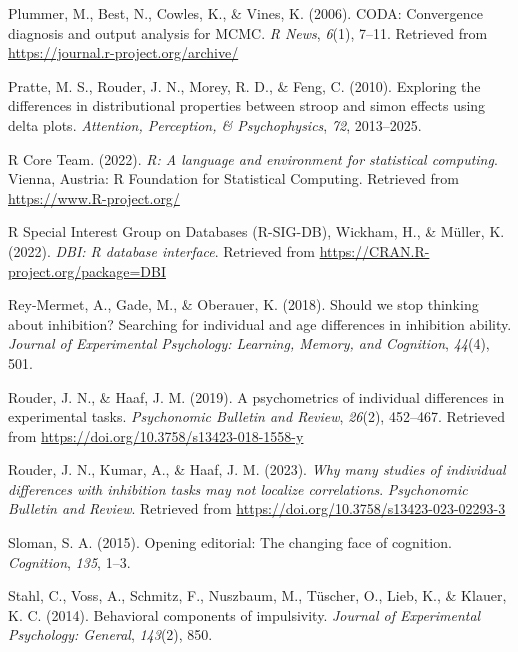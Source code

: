 \documentclass[
  man,floatsintext]{apa6}
\newlength{\cslhangindent}
\newlength{\cslentryspacingunit} %
\newenvironment{CSLReferences}[2] %
 {%
  \setlength{\parindent}{0pt}
  \ifodd #1
  \let\oldpar\par
  \def\par{\hangindent=\cslhangindent\oldpar}
  \fi
  \setlength{\parskip}{#2\cslentryspacingunit}
 }%
 {}
\begin{document}
\begin{CSLReferences}{1}{0}
\leavevmode{}%
Plummer, M., Best, N., Cowles, K., \& Vines, K. (2006). CODA: Convergence diagnosis and output analysis for MCMC. \emph{R News}, \emph{6}(1), 7--11. Retrieved from \url{https://journal.r-project.org/archive/}

\leavevmode{}%
Pratte, M. S., Rouder, J. N., Morey, R. D., \& Feng, C. (2010). Exploring the differences in distributional properties between stroop and simon effects using delta plots. \emph{Attention, Perception, \& Psychophysics}, \emph{72}, 2013--2025.

\leavevmode{}%
R Core Team. (2022). \emph{R: A language and environment for statistical computing}. Vienna, Austria: R Foundation for Statistical Computing. Retrieved from \url{https://www.R-project.org/}

\leavevmode{}%
R Special Interest Group on Databases (R-SIG-DB), Wickham, H., \& Müller, K. (2022). \emph{DBI: R database interface}. Retrieved from \url{https://CRAN.R-project.org/package=DBI}

\leavevmode{}%
Rey-Mermet, A., Gade, M., \& Oberauer, K. (2018). Should we stop thinking about inhibition? Searching for individual and age differences in inhibition ability. \emph{Journal of Experimental Psychology: Learning, Memory, and Cognition}, \emph{44}(4), 501.

\leavevmode{}%
Rouder, J. N., \& Haaf, J. M. (2019). A psychometrics of individual differences in experimental tasks. \emph{Psychonomic Bulletin and Review}, \emph{26}(2), 452--467. Retrieved from \url{https://doi.org/10.3758/s13423-018-1558-y}

\leavevmode{}%
Rouder, J. N., Kumar, A., \& Haaf, J. M. (2023). \emph{Why many studies of individual differences with inhibition tasks may not localize correlations}. \emph{Psychonomic Bulletin and Review}. Retrieved from \url{https://doi.org/10.3758/s13423-023-02293-3}

\leavevmode{}%
Sloman, S. A. (2015). Opening editorial: The changing face of cognition. \emph{Cognition}, \emph{135}, 1--3.

\leavevmode{}%
Stahl, C., Voss, A., Schmitz, F., Nuszbaum, M., Tüscher, O., Lieb, K., \& Klauer, K. C. (2014). Behavioral components of impulsivity. \emph{Journal of Experimental Psychology: General}, \emph{143}(2), 850.


\end{CSLReferences}
\end{document}
